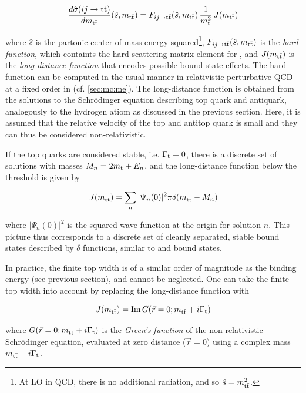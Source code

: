 \begin{equation}
\label{eq:theory:ttbar_factorization}
  \frac{d \hat{\sigma}(ij \rightarrow \mathrm{t \bar{t}})}{d m_{\mathrm{t \bar{t}}}} (\hat{s}, m_{\mathrm{t \bar{t}}}) = F_{ij \rightarrow \mathrm{t \bar{t}}} (\hat{s}, m_{\mathrm{t \bar{t}}}) \, \frac{1}{m_{\mathrm{t}}^2} \, J (m_{\mathrm{t \bar{t}}})
\end{equation}

\noindent where $\hat{s}$ is the partonic center-of-mass energy squared\footnote{At LO in QCD, there is no additional radiation, and so $\hat{s} = m_{\mathrm{t \bar{t}}}^2$.}, $F_{ij \rightarrow \mathrm{t \bar{t}}} (\hat{s}, m_{\mathrm{t \bar{t}}})$ is the \textit{hard function}, which containts the hard scattering matrix element for \pptt, and $J (m_{\mathrm{t \bar{t}}})$ is the \textit{long-distance function} that encodes possible bound state effects. The hard function can be computed in the usual manner in relativistic perturbative QCD at a fixed order in \alphas (cf. \cref{sec:mc:me}). The long-distance function is obtained from the solutions to the Schr\"odinger equation describing top quark and antiquark, analogously to the hydrogen atiom as discussed in the previous section. Here, it is assumed that the relative velocity of the top and antitop quark is small and they can thus be considered non-relativistic.

If the top quarks are considered stable, i.e. $\Gamma_{\mathrm{t}} = 0$, there is a discrete set of solutions with masses $M_n = 2 m_{\mathrm{t}} + E_n$, and the long-distance function below the threshold is given by~\cite{Kiyo:2008bv}

\begin{equation}
\label{eq:theory:longdistance_stable}
  J(m_{\mathrm{t \bar{t}}}) = \sum_n | \Psi_n (0) |^2 \pi \delta(m_{\mathrm{t \bar{t}}} - M_n)
\end{equation}

\noindent where $| \Psi_n (0) |^2$ is the squared wave function at the origin for solution $n$. This picture thus corresponds to a discrete set of cleanly separated, stable bound states described by $\delta$ functions, similar to \ccbar and \bbbar bound states.

In practice, the finite top width is of a similar order of magnitude as the binding energy (see previous section), and cannot be neglected. One can take the finite top width into account by replacing the long-distance function with~\cite{Kiyo:2008bv}

\begin{equation}
\label{eq:theory:longdistance_unstable}
  J (m_{\mathrm{t \bar{t}}}) = \mathrm{Im} \, G (\vec{r} = 0; m_{\mathrm{t \bar{t}}} + i \Gamma_{\mathrm{t}})
\end{equation}

\noindent where $G (\vec{r} = 0; m_{\mathrm{t \bar{t}}} + i \Gamma_{\mathrm{t}})$ is the \textit{Green's function} of the non-relativistic Schr\"odinger equation, evaluated at zero distance ($\vec{r} = 0$) using a complex mass $m_{\mathrm{t \bar{t}}} + i \Gamma_{\mathrm{t}}$. 

